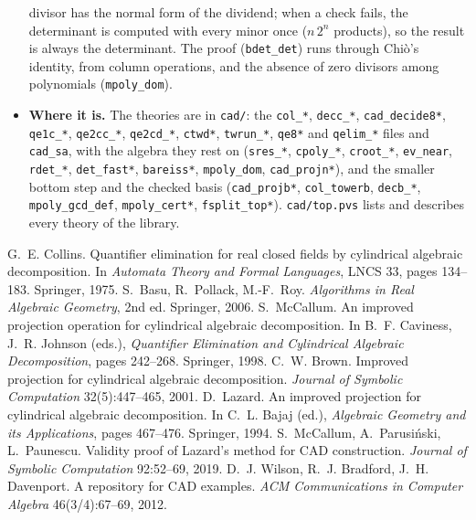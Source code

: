 \documentclass[11pt]{article}
\newcommand\code[1]{\mbox{\texttt{#1}}}
\begin{document}
\begin{itemize}[leftmargin=1.3em, itemsep=3pt]
divisor has the normal form of the dividend; when a check fails, the determinant is computed with every minor
once ($n\,2^n$ products), so the result is always the determinant. The proof (\code{bdet\_det}) runs through
Chi\`o's identity, from column operations, and the absence of zero divisors among polynomials
(\code{mpoly\_dom}).
\item \textbf{Where it is.} The theories are in \texttt{cad/}: the \texttt{col\_*}, \texttt{decc\_*},
\texttt{cad\_decide8*}, \texttt{qe1c\_*}, \texttt{qe2cc\_*}, \texttt{qe2cd\_*}, \texttt{ctwd*}, \texttt{twrun\_*},
\texttt{qe8*} and \texttt{qelim\_*} files and \texttt{cad\_sa}, with the algebra they rest on (\texttt{sres\_*},
\texttt{cpoly\_*}, \texttt{croot\_*}, \texttt{ev\_near}, \texttt{rdet\_*}, \texttt{det\_fast*}, \texttt{bareiss*}, \texttt{mpoly\_dom},
\texttt{cad\_projn*}), and the smaller bottom step and the checked basis (\texttt{cad\_projb*}, \texttt{col\_towerb},
\texttt{decb\_*}, \texttt{mpoly\_gcd\_def}, \texttt{mpoly\_cert*}, \texttt{fsplit\_top*}).
\texttt{cad/top.pvs} lists and describes every theory of the library.
\end{itemize}

\begin{thebibliography}{9}\footnotesize
\setlength\itemsep{1pt}
 G.~E. Collins. Quantifier elimination for real closed fields by cylindrical algebraic
  decomposition. In \emph{Automata Theory and Formal Languages}, LNCS 33, pages 134--183. Springer, 1975.
 S.~Basu, R.~Pollack, M.-F.~Roy. \emph{Algorithms in Real Algebraic Geometry}, 2nd ed. Springer, 2006.
 S.~McCallum. An improved projection operation for cylindrical algebraic decomposition. In
  B.~F. Caviness, J.~R. Johnson (eds.), \emph{Quantifier Elimination and Cylindrical Algebraic Decomposition}, pages
  242--268. Springer, 1998.
 C.~W. Brown. Improved projection for cylindrical algebraic decomposition. \emph{Journal of Symbolic
  Computation} 32(5):447--465, 2001.
 D.~Lazard. An improved projection for cylindrical algebraic decomposition. In C.~L. Bajaj (ed.),
  \emph{Algebraic Geometry and its Applications}, pages 467--476. Springer, 1994.
 S.~McCallum, A.~Parusi\'nski, L.~Paunescu. Validity proof of Lazard's method for CAD construction.
  \emph{Journal of Symbolic Computation} 92:52--69, 2019.
 D.~J. Wilson, R.~J. Bradford, J.~H. Davenport. A repository for CAD examples. \emph{ACM Communications
  in Computer Algebra} 46(3/4):67--69, 2012.
\end{thebibliography}
\end{document}
